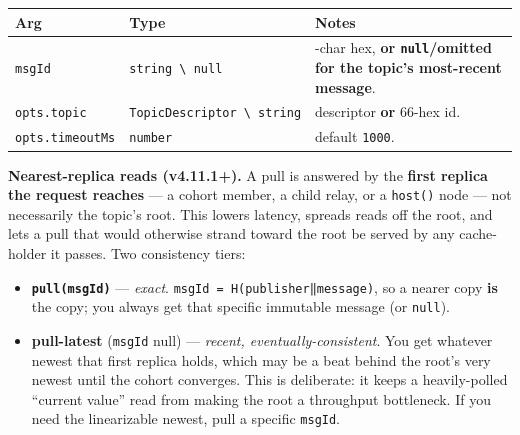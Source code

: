 \documentclass[
  nobib]{tufte-handout}
\newcounter{none} %
\providecommand{\tightlist}{%
  \setlength{\itemsep}{0pt}\setlength{\parskip}{0pt}}
\begin{document}
{\def\LTcaptype{none} %
\begin{longtable}[]{@{}
  >{\raggedright\arraybackslash}p{}
  >{\raggedright\arraybackslash}p{}
  >{\raggedright\arraybackslash}p{}@{}}
\toprule\noalign{}
\begin{minipage}[b]{\linewidth}\raggedright
Arg
\end{minipage} & \begin{minipage}[b]{\linewidth}\raggedright
Type
\end{minipage} & \begin{minipage}[b]{\linewidth}\raggedright
Notes
\end{minipage} \\
\midrule\noalign{}
\endhead
\bottomrule\noalign{}
\endlastfoot
\texttt{msgId} & \texttt{string\ \textbackslash{}\textbar{}\ null} &
64-char hex, \textbf{or \texttt{null}/omitted for the topic's
most-recent message}. \\
\texttt{opts.topic} &
\texttt{TopicDescriptor\ \textbackslash{}\textbar{}\ string} &
descriptor \textbf{or} 66-hex id. \\
\texttt{opts.timeoutMs} & \texttt{number} & default \texttt{1000}. \\
\end{longtable}
}

\textbf{Nearest-replica reads (v4.11.1+).} A pull is answered by the
\textbf{first replica the request reaches} --- a cohort member, a child
relay, or a \texttt{host()} node --- not necessarily the topic's root.
This lowers latency, spreads reads off the root, and lets a pull that
would otherwise strand toward the root be served by any cache-holder it
passes. Two consistency tiers:

\begin{itemize}
\tightlist
\item
  \textbf{\texttt{pull(msgId)}} --- \emph{exact}.
  \texttt{msgId\ =\ H(publisher‖message)}, so a nearer copy \textbf{is}
  the copy; you always get that specific immutable message (or
  \texttt{null}).
\item
  \textbf{pull-latest} (\texttt{msgId} null) --- \emph{recent,
  eventually-consistent}. You get whatever newest that first replica
  holds, which may be a beat behind the root's very newest until the
  cohort converges. This is deliberate: it keeps a heavily-polled
  ``current value'' read from making the root a throughput bottleneck.
  If you need the linearizable newest, pull a specific \texttt{msgId}.
\end{itemize}
\end{document}
